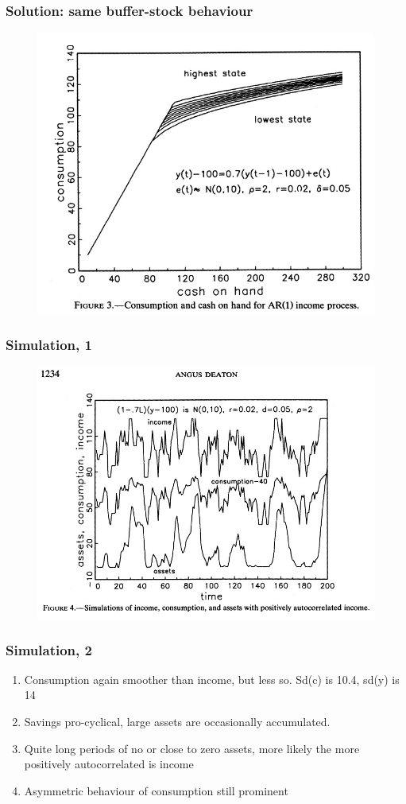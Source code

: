 \documentclass[mathserif]{beamer}
\begin{document}
\begin{frame}
\frametitle{Solution: same buffer-stock behaviour}
\begin{figure}
\includegraphics[height=2.5 in, scale=0.5]{figure3.jpg}
\end{figure}
\end{frame}

\begin{frame}
\frametitle{Simulation, 1}
\begin{figure}
\includegraphics[height=2.5 in, scale=0.5]{figure4.jpg}
\end{figure}
\end{frame}

\begin{frame}
\frametitle{Simulation, 2}
    \begin{enumerate}
      \item Consumption again smoother than income, but less so. Sd(c) is 10.4, sd(y) is 14
      \item Savings pro-cyclical, large assets are occasionally accumulated. 
      \item Quite long periods of no or close to zero assets, more likely the more positively autocorrelated is income
      \item Asymmetric behaviour of consumption still prominent
    \end{enumerate}
\end{frame}
\end{document}
